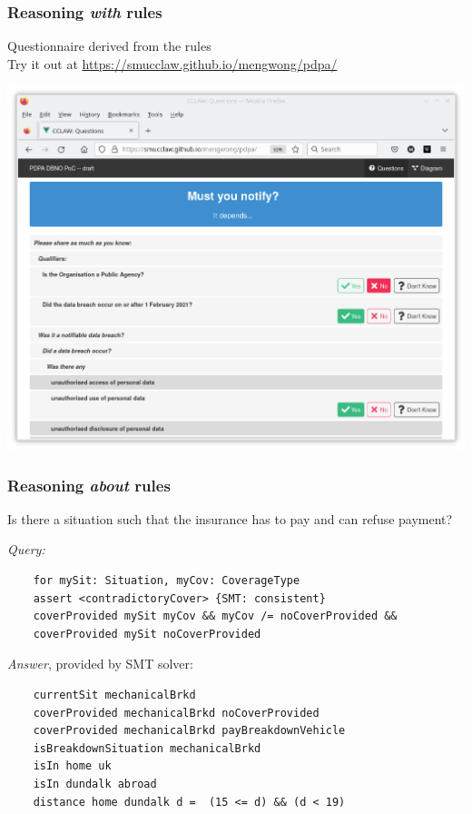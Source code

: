 \documentclass{beamer}
\begin{document}
\begin{frame}[fragile]\frametitle{Reasoning \emph{with} rules}

  Questionnaire derived from the rules\\
  Try it out at \url{https://smucclaw.github.io/mengwong/pdpa/}

  
  \begin{center}
    \includegraphics[scale=0.3]{Figures/pdpa_questionnaire.png}
  \end{center}  

\end{frame}


\begin{frame}[fragile]\frametitle{Reasoning \emph{about} rules}


   Is there a situation such that the
  insurance has to pay and can refuse payment?
  

  \vspace{2mm}
  \emph{Query:}
    \begin{lstlisting}
    for mySit: Situation, myCov: CoverageType
    assert <contradictoryCover> {SMT: consistent}
    coverProvided mySit myCov && myCov /= noCoverProvided &&
    coverProvided mySit noCoverProvided
  \end{lstlisting}
  \vspace{-4mm}
  \emph{Answer}, provided by SMT solver:
  \begin{lstlisting}
    currentSit mechanicalBrkd
    coverProvided mechanicalBrkd noCoverProvided
    coverProvided mechanicalBrkd payBreakdownVehicle
    isBreakdownSituation mechanicalBrkd
    isIn home uk
    isIn dundalk abroad
    distance home dundalk d =  (15 <= d) && (d < 19)
  \end{lstlisting}

\end{frame}
\end{document}
